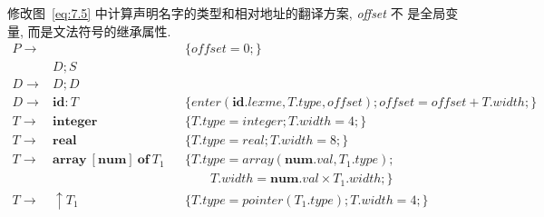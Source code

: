 \documentclass[boxes]{homework}
\begin{document}
\begin{problem}
修改图~\ref{eq:7.5} 中计算声明名字的类型和相对地址的翻译方案, \textit{offset} 不
是全局变量, 而是文法符号的继承属性.
\begin{equation}
    \begin{aligned}
        P \to &                                                    &  & \{\mathit{offset} = 0;\}                                                                            \\
              & D; S                                                                                                                                                        \\
        D \to & D; D                                                                                                                                                        \\
        D \to & \mathbf{id}: T                                     &  & \{enter(\mathbf{id}.lexme, T.type, \mathit{offset}); \mathit{offset} = \mathit{offset} + T.width;\} \\
        T \to & \mathbf{integer}                                   &  & \{T.type = integer; T.width = 4;\}                                                                  \\
        T \to & \mathbf{real}                                      &  & \{T.type = real; T.width = 8;\}                                                                     \\
        T \to & \mathbf{array}\ [\mathbf{num}]\ \mathbf{of}\ T_{1} &  & \{T.type = array(\mathbf{num}.val, T_{1}.type);                                                     \\
              &                                                    &  & \qquad T.width = \mathbf{num}.val \times T_{1}.width;\}                                             \\
        T \to & \uparrow T_{1}                                     &  & \{T.type = pointer(T_{1}.type); T.width = 4;\}
    \end{aligned}
    \tag{7.5}
    \label{eq:7.5}
\end{equation}
\end{problem}
\end{document}
